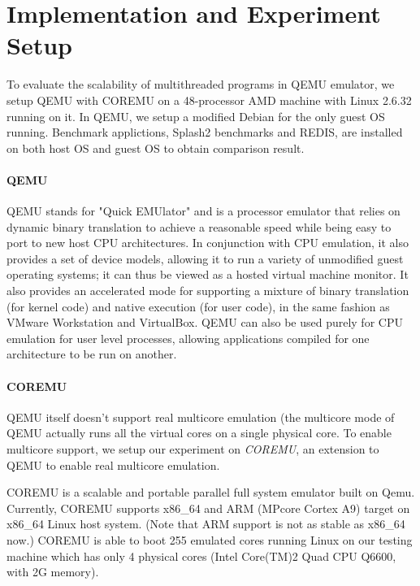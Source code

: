\section{Implementation and Experiment Setup}
\label{sec:setup}

To evaluate the scalability of multithreaded programs in QEMU emulator, we 
setup QEMU with COREMU on a 48-processor AMD machine with Linux 2.6.32 running
on it. In QEMU, we setup a modified Debian for the only guest OS running. 
Benchmark applictions, Splash2 benchmarks and REDIS, are installed on both 
host OS and guest OS to obtain comparison result. 

\paragraph{QEMU\cite{rel:qemuwiki}}
QEMU stands for "Quick EMUlator" and is a processor emulator that relies on 
dynamic binary translation to achieve a reasonable speed while being easy to 
port to new host CPU architectures.
In conjunction with CPU emulation, it also provides a set of device models, 
allowing it to run a variety of unmodified guest operating systems; 
it can thus be viewed as a hosted virtual machine monitor. It also provides 
an accelerated mode for supporting a mixture of binary translation (for 
kernel code) and native execution (for user code), in the same fashion as 
VMware Workstation and VirtualBox. QEMU can also be used purely for CPU 
emulation for user level processes, allowing applications compiled for one 
architecture to be run on another.

\paragraph{COREMU\cite{rel:coremu}} 
QEMU itself doesn't support real multicore emulation 
(the multicore mode of QEMU actually runs all the virtual cores on a single 
physical core. To enable multicore support, we setup our experiment on 
\emph{COREMU}, an extension to QEMU to enable real multicore emulation. 

COREMU is a scalable and portable parallel full system emulator built on Qemu. 
Currently, COREMU supports x86\_64 and ARM (MPcore Cortex A9) target on x86\_64 
Linux host system. (Note that ARM support is not as stable as x86\_64 now.)
COREMU is able to boot 255 emulated cores running Linux on our testing machine 
which has only 4 physical cores (Intel Core(TM)2 Quad CPU Q6600, with 2G memory).

